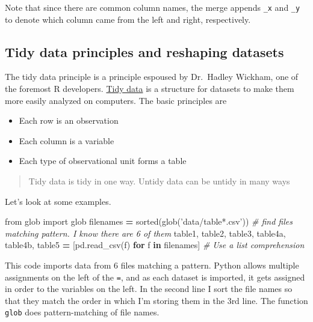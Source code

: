 \documentclass[
  letterpaper,
]{scrbook}
\newenvironment{Shaded}{\begin{snugshade}}{\end{snugshade}}
\newcommand{\BuiltInTok}[1]{#1}
\newcommand{\CommentTok}[1]{\textcolor[rgb]{0.56,0.35,0.01}{\textit{#1}}}
\newcommand{\ControlFlowTok}[1]{\textcolor[rgb]{0.13,0.29,0.53}{\textbf{#1}}}
\newcommand{\ImportTok}[1]{#1}
\newcommand{\KeywordTok}[1]{\textcolor[rgb]{0.13,0.29,0.53}{\textbf{#1}}}
\newcommand{\NormalTok}[1]{#1}
\newcommand{\OperatorTok}[1]{\textcolor[rgb]{0.81,0.36,0.00}{\textbf{#1}}}
\newcommand{\StringTok}[1]{\textcolor[rgb]{0.31,0.60,0.02}{#1}}
\providecommand{\tightlist}{%
  \setlength{\itemsep}{0pt}\setlength{\parskip}{0pt}}
\begin{document}
Note that since there are common column names, the merge appends \texttt{\_x} and \texttt{\_y} to denote which column came from the left and right, respectively.

\hypertarget{tidy-data-principles-and-reshaping-datasets}{%
\subsection{Tidy data principles and reshaping datasets}\label{tidy-data-principles-and-reshaping-datasets}}

The tidy data principle is a principle espoused by Dr.~Hadley Wickham, one of the foremost R developers. \href{http://vita.had.co.nz/papers/tidy-data.pdf}{Tidy data} is a structure for datasets to make them more easily analyzed on computers. The basic principles are

\begin{itemize}
\tightlist
\item
  Each row is an observation
\item
  Each column is a variable
\item
  Each type of observational unit forms a table
\end{itemize}

\begin{quote}
Tidy data is tidy in one way. Untidy data can be untidy in many ways
\end{quote}

Let's look at some examples.

\begin{Shaded}
\begin{Highlighting}[]
\ImportTok{from}\NormalTok{ glob }\ImportTok{import}\NormalTok{ glob}
\NormalTok{filenames }\OperatorTok{=} \BuiltInTok{sorted}\NormalTok{(glob(}\StringTok{'data/table*.csv'}\NormalTok{)) }\CommentTok{# find files matching pattern. I know there are 6 of them}
\NormalTok{table1, table2, table3, table4a, table4b, table5 }\OperatorTok{=}\NormalTok{ [pd.read_csv(f) }\ControlFlowTok{for}\NormalTok{ f }\KeywordTok{in}\NormalTok{ filenames] }\CommentTok{# Use a list comprehension}
\end{Highlighting}
\end{Shaded}

This code imports data from 6 files matching a pattern. Python allows multiple assignments on the left of the \texttt{=}, and as each dataset is imported, it gets assigned in order to the variables on the left. In the second line I sort the file names so that they match the order in which I'm storing them in the 3rd line. The function \texttt{glob} does pattern-matching of file names.
\end{document}
